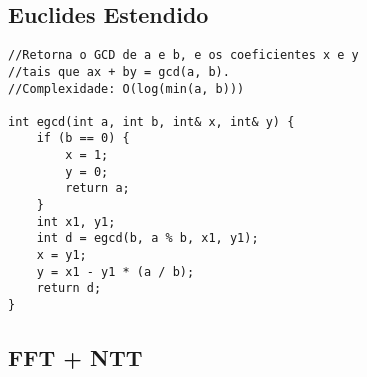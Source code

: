 \documentclass[11pt, a4paper, twoside]{article}
\begin{document}
\subsection{Euclides Estendido}
\begin{verbatim}
//Retorna o GCD de a e b, e os coeficientes x e y
//tais que ax + by = gcd(a, b).
//Complexidade: O(log(min(a, b)))

int egcd(int a, int b, int& x, int& y) {
    if (b == 0) {
        x = 1;
        y = 0;
        return a;
    }
    int x1, y1;
    int d = egcd(b, a % b, x1, y1);
    x = y1;
    y = x1 - y1 * (a / b);
    return d;
}
\end{verbatim}

\subsection{FFT + NTT}
\end{document}
